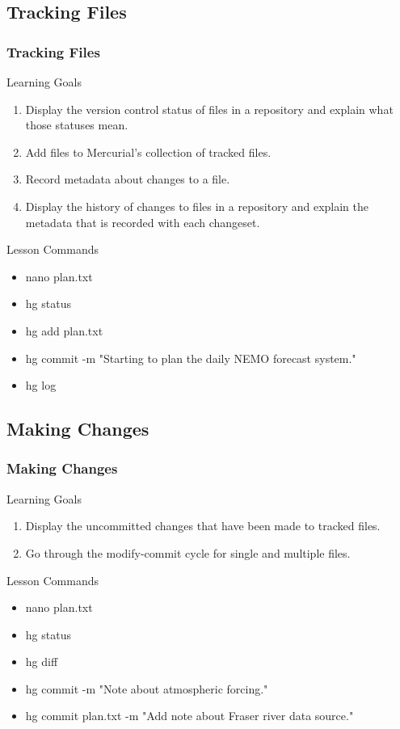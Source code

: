 \documentclass{beamer}
\begin{document}
\subsection*{Tracking Files}
\begin{frame}
\frametitle{Tracking Files}
\begin{block}{Learning Goals}
\begin{enumerate}
\item Display the version control status of files in a repository and explain what those statuses mean.
\item Add files to Mercurial's collection of tracked files.
\item Record metadata about changes to a file.
\item Display the history of changes to files in a repository and explain the metadata that is recorded with each changeset.
\end{enumerate}
\end{block}
\begin{block}{Lesson Commands}
\begin{multicols}{2}
\begin{itemize}
\item nano plan.txt
\item hg status
\item hg add plan.txt
\item hg commit -m "Starting to plan the daily NEMO forecast system."
\item hg log
\end{itemize}
\end{multicols}
\end{block}
\end{frame}

\subsection*{Making Changes}
\begin{frame}
\frametitle{Making Changes}
\begin{block}{Learning Goals}
\begin{enumerate}
\item Display the uncommitted changes that have been made to tracked files.
\item Go through the modify-commit cycle for single and multiple files.
\end{enumerate}
\end{block}
\begin{block}{Lesson Commands}
\begin{multicols}{2}
\begin{itemize}
\item nano plan.txt
\item hg status
\item hg diff
\columnbreak
\item hg commit -m "Note about atmospheric forcing."
\item hg commit plan.txt -m "Add note about Fraser river data source."
\end{itemize}
\end{multicols}
\end{block}
\end{frame}
\end{document}
